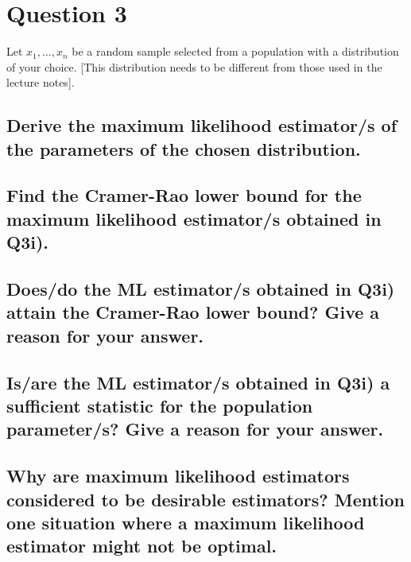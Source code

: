 \documentclass[]{article}
\begin{document}
	






\section{Question 3}

Let $x_1, \dots, x_n$ be a random sample selected from a population with a distribution of your choice. [This distribution needs to be different from those used in the lecture notes].

\subsection{Derive the maximum likelihood estimator/s of the parameters of the chosen distribution.}

\subsection{Find the Cramer-Rao lower bound for the maximum likelihood estimator/s obtained in Q3i).}

\subsection{Does/do the ML estimator/s obtained in Q3i) attain the Cramer-Rao lower bound?  Give a reason for your answer. }

\subsection{Is/are the ML estimator/s obtained in Q3i) a sufficient statistic for the population parameter/s?  Give a reason for your answer.}

\subsection{Why are maximum likelihood estimators considered to be desirable estimators?  Mention one situation where a maximum likelihood estimator might not be optimal.   }

\end{document}

